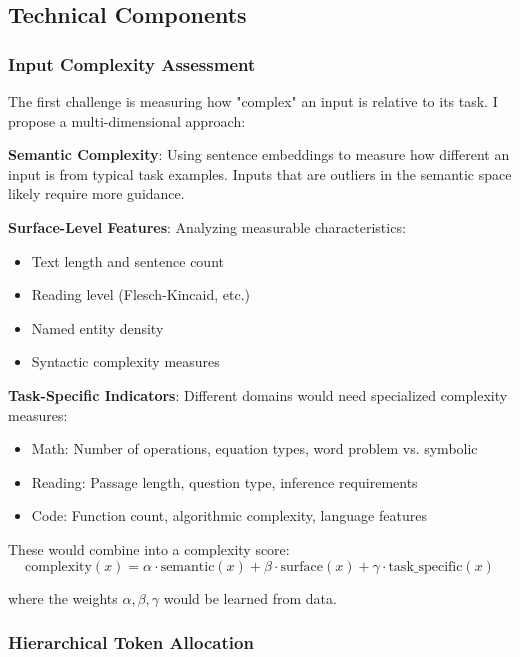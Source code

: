 \documentclass[11pt,a4paper]{article}
\begin{document}
\subsection{Technical Components}

\subsubsection{Input Complexity Assessment}

The first challenge is measuring how "complex" an input is relative to its task. I propose a multi-dimensional approach:

\textbf{Semantic Complexity}: Using sentence embeddings to measure how different an input is from typical task examples. Inputs that are outliers in the semantic space likely require more guidance.

\textbf{Surface-Level Features}: Analyzing measurable characteristics:
\begin{itemize}
\item Text length and sentence count
\item Reading level (Flesch-Kincaid, etc.)
\item Named entity density
\item Syntactic complexity measures
\end{itemize}

\textbf{Task-Specific Indicators}: Different domains would need specialized complexity measures:
\begin{itemize}
\item Math: Number of operations, equation types, word problem vs. symbolic
\item Reading: Passage length, question type, inference requirements
\item Code: Function count, algorithmic complexity, language features
\end{itemize}

These would combine into a complexity score:
\begin{equation}
\text{complexity}(x) = \alpha \cdot \text{semantic}(x) + \beta \cdot \text{surface}(x) + \gamma \cdot \text{task\_specific}(x)
\end{equation}

where the weights $\alpha, \beta, \gamma$ would be learned from data.

\subsubsection{Hierarchical Token Allocation}
\end{document}
